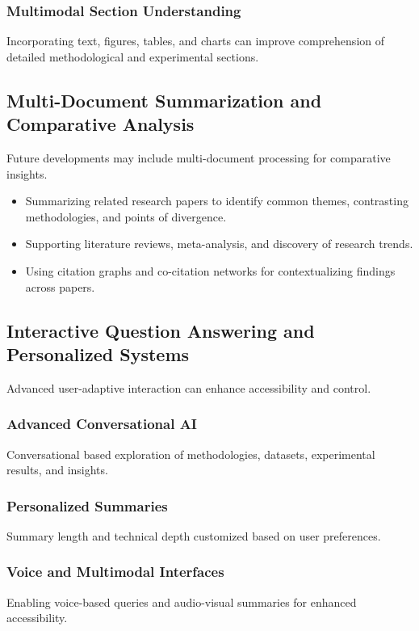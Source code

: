 \documentclass[conference]{IEEEtran}
\begin{document}
\subsubsection{Multimodal Section Understanding}
Incorporating text, figures, tables, and charts can improve comprehension of detailed methodological and experimental sections.

\subsection{Multi-Document Summarization and Comparative Analysis}
Future developments may include multi-document processing for comparative insights.

\begin{itemize}
    \item Summarizing related research papers to identify common themes, contrasting methodologies, and points of divergence.
    \item Supporting literature reviews, meta-analysis, and discovery of research trends.
    \item Using citation graphs and co-citation networks for contextualizing findings across papers.
\end{itemize}

\subsection{Interactive Question Answering and Personalized Systems}
Advanced user-adaptive interaction can enhance accessibility and control.

\subsubsection{Advanced Conversational AI}
Conversational based exploration of methodologies, datasets, experimental results, and insights.

\subsubsection{Personalized Summaries}
Summary length and technical depth customized based on user preferences.

\subsubsection{Voice and Multimodal Interfaces}
Enabling voice-based queries and audio-visual summaries for enhanced accessibility.
\end{document}
